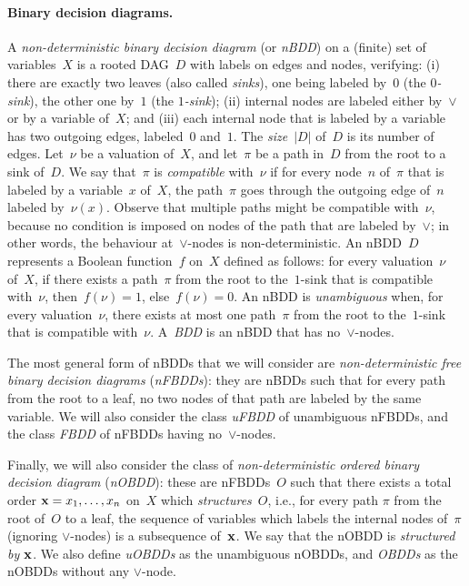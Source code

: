 
\paragraph*{Binary decision diagrams.}
A \emph{non-deterministic binary decision diagram} (or \emph{nBDD}) on a
(finite) set of variables~$X$ is a rooted DAG~$D$ with labels on edges and
nodes, verifying: (i) there are exactly two leaves (also called \emph{sinks}),
one being labeled by~$0$ (the \emph{$0$-sink}), the other one by~$1$ (the
\emph{$1$-sink}); (ii) internal nodes are labeled either by~$\lor$ or by a
variable of~$X$; and (iii) each internal node that is labeled by a variable has
two outgoing edges, labeled~$0$ and~$1$.  The \emph{size}~$|D|$ of~$D$ is its
number of edges.  Let~$\nu$ be a valuation of~$X$, and let~$\pi$ be a path
in~$D$ from the root to a sink of~$D$.  We say that~$\pi$ is \emph{compatible}
with~$\nu$ if for every node~$n$ of~$\pi$ that is labeled by a variable~$x$
of~$X$, the path~$\pi$ goes through the outgoing edge of~$n$ labeled
by~$\nu(x)$.  Observe that multiple paths might be compatible with~$\nu$,
because no condition is imposed on nodes of the path that are labeled
by~$\lor$; in other words, the behaviour at~$\lor$-nodes is non-deterministic.
An nBDD~$D$ represents a Boolean function~$f$ on~$X$ defined as follows:
for every valuation~$\nu$ of~$X$, if there exists a path~$\pi$ from the root to
the~$1$-sink that is compatible with~$\nu$, then~$f(\nu)=1$, else~$f(\nu)=0$.
An nBDD is \emph{unambiguous} when, for every valuation~$\nu$, there exists at
most one path~$\pi$ from the root to the~$1$-sink that is compatible
with~$\nu$.  A~\emph{BDD} is an nBDD that has no~$\lor$-nodes.

	The most general form of nBDDs that we will consider are
\emph{non-deterministic free binary decision diagrams} (\emph{nFBDDs}): they
are nBDDs such that for every path from the root to a leaf, no two nodes of
that path are labeled by the same variable.  We will also consider the class
\emph{uFBDD} of unambiguous nFBDDs, and the class \emph{FBDD} of nFBDDs having
no~$\lor$-nodes.

	Finally, we will also consider the class of \emph{non-deterministic
ordered binary decision diagram} (\emph{nOBDD}): these are nFBDDs~$O$ such that
there exists a total order $\mathbf{x} = x_1, \ldots, x_n$ on~$X$ which
\emph{structures}~$O$, i.e., for every path $\pi$ from the root of~$O$ to a
leaf, the sequence of variables which labels the internal nodes of~$\pi$
(ignoring $\lor$-nodes) is a subsequence of~$\mathbf{x}$.  We say that the
nOBDD is \emph{structured by $\mathbf{x}$}.  We also define \emph{uOBDDs} as
the unambiguous nOBDDs, and \emph{OBDDs} as the nOBDDs without any $\lor$-node.

